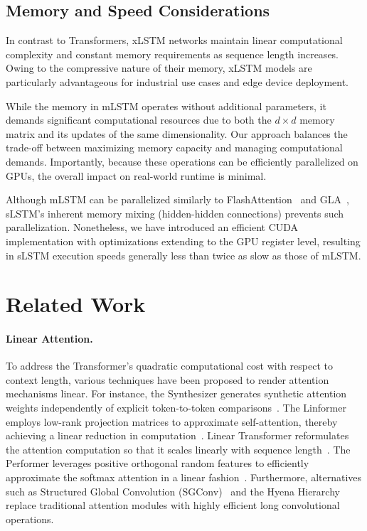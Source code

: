 \subsection{Memory and Speed Considerations}

In contrast to Transformers, xLSTM networks maintain linear computational complexity and constant memory requirements as sequence length increases. Owing to the compressive nature of their memory, xLSTM models are particularly advantageous for industrial use cases and edge device deployment.

While the memory in mLSTM operates without additional parameters, it demands significant computational resources due to both the $d \times d$ memory matrix and its updates of the same dimensionality. Our approach balances the trade-off between maximizing memory capacity and managing computational demands. Importantly, because these operations can be efficiently parallelized on GPUs, the overall impact on real-world runtime is minimal.

Although mLSTM can be parallelized similarly to FlashAttention~\citep{Dao:22,Dao:23} and GLA~\citep{Yang:23arxiv}, sLSTM's inherent memory mixing (hidden-hidden connections) prevents such parallelization. Nonetheless, we have introduced an efficient CUDA implementation with optimizations extending to the GPU register level, resulting in sLSTM execution speeds generally less than twice as slow as those of mLSTM.

\section{Related Work}
\label{sec:related}

\paragraph{Linear Attention.} To address the Transformer’s quadratic computational cost with respect to context length, various techniques have been proposed to render attention mechanisms linear. For instance, the Synthesizer generates synthetic attention weights independently of explicit token-to-token comparisons~\citep{Tay:20arxiv}. The Linformer employs low-rank projection matrices to approximate self-attention, thereby achieving a linear reduction in computation~\citep{Wang:20arxiv}. Linear Transformer reformulates the attention computation so that it scales linearly with sequence length~\citep{Katharopoulos:20}. The Performer leverages positive orthogonal random features to efficiently approximate the softmax attention in a linear fashion~\citep{Choromanski:21}. Furthermore, alternatives such as Structured Global Convolution (SGConv)~\citep{Li:22} and the Hyena Hierarchy~\citep{Poli:23} replace traditional attention modules with highly efficient long convolutional operations.

